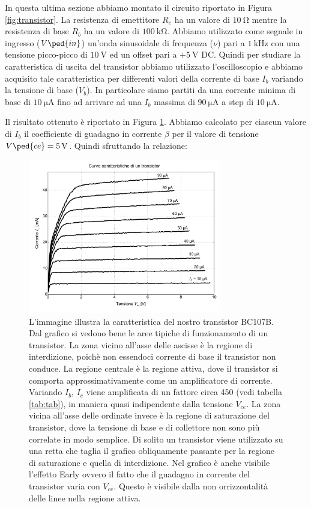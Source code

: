 In questa ultima sezione abbiamo montato il circuito riportato in Figura \ref{fig:transistor}. La resistenza di emettitore $R_e$ ha un valore di $\SI{10}{\ohm}$ mentre la resistenza di base $R_b$ ha un valore di $\SI{100}{\kilo\ohm}$. Abbiamo utilizzato come segnale in ingresso ($V\ped{in}$) un'onda sinusoidale di frequenza ($\nu$) pari a $\SI{1}{\kilo\hertz}$ con una tensione picco-picco di $\SI{10}{\volt}$ ed un offset pari a $+\SI{5}{\volt}$ DC.
Quindi per studiare la caratteristica di uscita del transistor abbiamo utilizzato l'oscilloscopio e abbiamo acquisito tale caratteristica per differenti valori della corrente di base $I_b$ variando la tensione di base ($V_b$). In particolare siamo partiti da una corrente minima di base di $\SI{10}{\micro\ampere}$ fino ad arrivare ad una $I_b$ massima di $\SI{90}{\micro\ampere}$ a step di $\SI{10}{\micro\ampere}$.

Il risultato ottenuto è riportato in Figura \ref{fig:cara}.
Abbiamo calcolato per ciascun valore di $I_b$ il coefficiente di guadagno in corrente $\beta$ per il valore di tensione $V\ped{ce}=\SI{5}{\volt}$. Quindi sfruttando la relazione:

\begin{figure}[t!]
	\centering
	\includegraphics[width=0.75\textwidth]{transistor.pdf}
	\caption{L'immagine illustra la caratteristica del nostro transistor BC107B. Dal grafico si vedono bene le aree
	    tipiche di funzionamento di un transistor. La zona vicino all'asse delle ascisse è la regione di interdizione,
	    poichè non essendoci corrente di base il transistor non conduce. La regione centrale è la regione attiva,
	    dove il transistor si comporta approssimativamente come un amplificatore di corrente. Variando $I_b$,
	    $I_c$ viene amplificata di un fattore circa 450 (vedi tabella \ref{tab:tab}), in maniera quasi indipendente
	    dalla tensione $V_{ce}$.
	    La zona vicina all'asse delle ordinate invece è la regione di saturazione del transistor,
	    dove la tensione di base e di collettore non sono più correlate in modo semplice.
	    Di solito un transistor viene utilizzato su una retta che taglia il grafico obliquamente
	    passante per la regione di saturazione e quella di interdizione. Nel grafico è anche visibile l'effetto Early
	    ovvero il fatto che il guadagno in corrente del transistor varia con $V_{ce}$. Questo è visibile
	    dalla non orrizzontalità delle linee nella regione attiva.}
	\label{fig:cara}
\end{figure}

